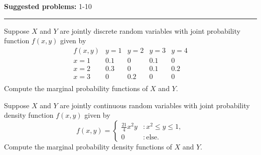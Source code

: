 \documentclass[12pt,reqno]{amsart}
\begin{document}
\textbf{Suggested problems:} 1-10

\bigskip
\hrule

\bigskip
\prob Suppose $X$ and $Y$ are jointly discrete random variables with joint probability function $f(x,y)$ given by
	\[
	\begin{array}{c|llll}
       	f(x,y) & y=1 & y=2 & y=3 & y=4 \\
	\hline
	x=1 & 0.1 & 0 & 0.1 & 0 \\
	x=2 & 0.3 & 0 & 0.1 & 0.2\\
	x=3 & 0 & 0.2 & 0 & 0\\
	\end{array}
	\]
Compute the marginal probability functions of $X$ and $Y$.

\vfill
\prob Suppose $X$ and $Y$ are jointly continuous random variables with joint probability density function $f(x,y)$ given by
	\[
	f(x,y) = \begin{cases}
	\frac{21}{4} x^2 y & : x^2 \leq y \leq 1, \\
	0 & : \text{else}.
	\end{cases}
	\]
Compute the marginal probability density functions of $X$ and $Y$.

\vfill
\end{document}
